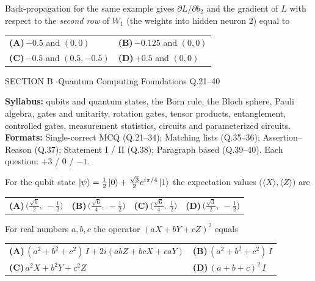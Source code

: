\documentclass[11pt,a4paper]{article}
\newcommand{\optlabel}[1]{\textbf{(#1)}}
\newenvironment{qitem}[1]{\begin{list}{}{\setlength{\leftmargin}{3.3em}\setlength{\labelwidth}{3.1em}%
  \setlength{\labelsep}{0.2em}\setlength{\topsep}{3pt}\setlength{\parsep}{3pt}}\item[\textbf{Q.#1}\hfill]}{\end{list}}
\newcommand{\qsep}{\par\vspace{2pt}{\color{black!15}\hrule}\vspace{4pt}}
\begin{document}
\begin{qitem}{20}
Back-propagation for the same example gives $\partial L/\partial b_2$ and the gradient of $L$ with respect to
the \emph{second row} of $W_1$ (the weights into hidden neuron 2) equal to
\par\smallskip\noindent\begin{tabularx}{\linewidth}{@{}*{2}{L}@{}}
\optlabel{A}\,$-0.5$ and $(0, 0)$ & \optlabel{B}\,$-0.125$ and $(0, 0)$ \\[3pt]
\optlabel{C}\,$-0.5$ and $(0.5, -0.5)$ & \optlabel{D}\,$+0.5$ and $(0, 0)$
\end{tabularx}
\end{qitem}
\qsep

\newpage

\begin{sectionbanner}SECTION B \enspace$\cdot$\enspace Quantum Computing Foundations \hfill Q.21--40\end{sectionbanner}

{\small \textbf{Syllabus:} qubits and quantum states, the Born rule, the Bloch sphere, Pauli algebra, gates and unitarity, rotation gates, tensor products, entanglement, controlled gates, measurement statistics, circuits and parameterized circuits.\\ \textbf{Formats:} Single-correct MCQ (Q.21--34); Matching lists (Q.35--36); Assertion--Reason (Q.37); Statement I / II (Q.38); Paragraph based (Q.39--40). Each question: $+3$ / $0$ / $-1$.}
\par\medskip

\begin{qitem}{21}
For the qubit state $\ket\psi = \frac12\ket0 + \frac{\sqrt3}{2}e^{i\pi/4}\ket1$ the expectation values
$\big(\langle X\rangle, \langle Z\rangle\big)$ are
\par\smallskip\noindent\begin{tabularx}{\linewidth}{@{}*{4}{L}@{}}
\optlabel{A}\,$\big(\tfrac{\sqrt6}{2},\ -\tfrac12\big)$ & \optlabel{B}\,$\big(\tfrac{\sqrt6}{4},\ -\tfrac12\big)$ & \optlabel{C}\,$\big(\tfrac{\sqrt6}{4},\ \tfrac12\big)$ & \optlabel{D}\,$\big(\tfrac{\sqrt3}{2},\ -\tfrac12\big)$
\end{tabularx}
\end{qitem}
\qsep

\begin{qitem}{22}
For real numbers $a, b, c$ the operator $(aX + bY + cZ)^2$ equals
\par\smallskip\noindent\begin{tabularx}{\linewidth}{@{}*{2}{L}@{}}
\optlabel{A}\,$(a^2 + b^2 + c^2)\,I + 2i(abZ + bcX + caY)$ & \optlabel{B}\,$(a^2 + b^2 + c^2)\,I$ \\[3pt]
\optlabel{C}\,$a^2X + b^2Y + c^2Z$ & \optlabel{D}\,$(a + b + c)^2\,I$
\end{tabularx}
\end{qitem}
\qsep
\end{document}
